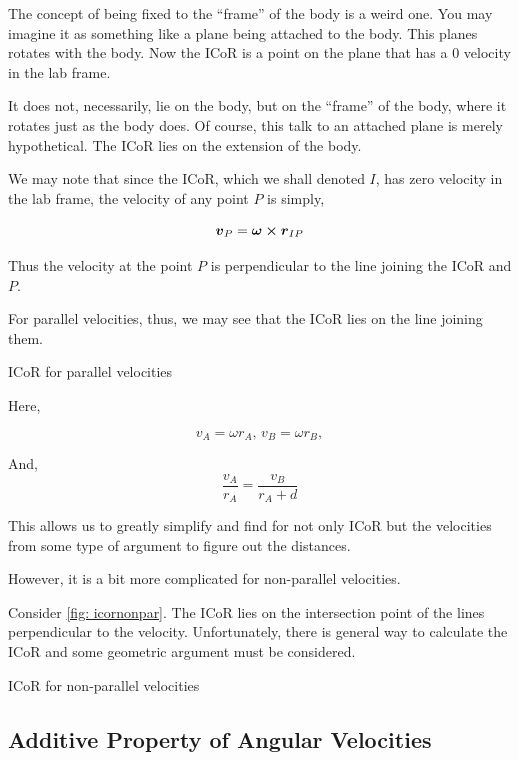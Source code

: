 The concept of being fixed to the ``frame'' of the body is a weird one. You may imagine 
it as something like a plane being attached to the body. This planes rotates with the body.
Now the ICoR is a point on the plane that has a \(0\) velocity in the lab frame. 

It does not, necessarily, lie on the body, but on the ``frame'' of the body, where it rotates just as the body does.
Of course, this talk to an attached plane is merely hypothetical. The ICoR lies 
on the extension of the body.

We may note that since the ICoR, which we shall denoted \(I\), has zero velocity in the lab frame, 
the velocity of any point \(P\) is simply,

\[\vv_P = \vec{\omega} \cp \vec{r}_{IP}\]

Thus the velocity at the point \(P\) is perpendicular to the line joining 
the ICoR and \(P\). 

For parallel velocities, thus, we may see that the ICoR lies on the line joining them.

\begin{marginfigure}
    \caption{ICoR for parallel velocities}
\end{marginfigure}

Here, 

\[v_A = \omega r_A, \, v_B = \omega r_B,\]

And, 
\[\frac{v_A}{r_A} = \frac{v_B}{r_A + d}\]

This allows us to greatly simplify and find for not only ICoR but the velocities 
from some type of argument to figure out the distances.

However, it is a bit more complicated for non-parallel velocities.

Consider \cref{fig: icornonpar}. The ICoR lies on the intersection point of the lines 
perpendicular to the velocity. Unfortunately, there is general way to calculate the 
ICoR and some geometric argument must be considered.

\begin{marginfigure}
    \caption{ICoR for non-parallel velocities}
    \label{fig: icornonpar}
\end{marginfigure}

\subsection{Additive Property of Angular Velocities}

